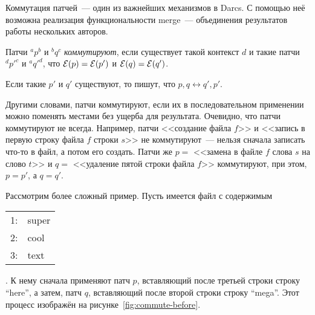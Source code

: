 Коммутация патчей~--- один из важнейших механизмов в Darcs. С помощью
неё возможна реализация функциональности merge~--- объединения
результатов работы нескольких авторов.

\begin{definition}
  Патчи ${}^ap^b$ и ${}^bq^c$ \emph{коммутируют}, если существует
  такой контекст $d$ и такие патчи ${}^d{p'}^c$ и ${}^a{q'}^d$, что
  ${\cal E}(p) = {\cal E}(p')$ и ${\cal E}(q) = {\cal E}(q')$.

  Если такие $p'$ и $q'$ существуют, то пишут, что $p, q
  \longleftrightarrow q', p'$.
\end{definition}

Другими словами, патчи коммутируют, если их в последовательном
применении можно поменять местами без ущерба для результата.
Очевидно, что патчи коммутируют не всегда. Например, патчи <<создание
файла $f$>> и <<запись в первую строку файла $f$ строки $s$>> не
коммутируют~--- нельзя сначала записать что-то в файл, а потом его
создать. Патчи же $p = $ <<замена в файле $f$ слова $s$ на слово $t$>>
и $q = $ <<удаление пятой строки файла $f$>> коммутируют, при этом, $p
= p'$, а $q = q'$. 

Рассмотрим более сложный пример. Пусть имеется файл с содержимым 
\begin{tabular}{|r|l|}
  \hline
  1: & super \\
  2: & cool \\
  3: & text \\
  \hline
\end{tabular}. 
К нему сначала применяют патч $p$, вставляющий после
третьей строки строку ``here'', а
затем, патч $q$, вставляющий после второй строки строку ``mega''. 
Этот процесс изображён на рисунке~\ref{fig:commute-before}.

